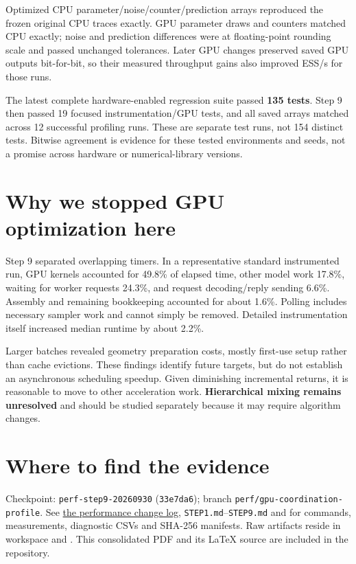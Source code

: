 \documentclass[11pt]{article}
\newcommand{\heading}[1]{\section*{#1}}
\begin{document}
Optimized CPU parameter/noise/counter/prediction arrays reproduced the frozen
original CPU traces exactly. GPU parameter draws and counters matched CPU exactly;
noise and prediction differences were at floating-point rounding scale and passed
unchanged tolerances. Later GPU changes preserved saved GPU outputs bit-for-bit,
so their measured throughput gains also improved ESS/s for those runs.

The latest complete hardware-enabled regression suite passed \textbf{135 tests}.
Step 9 then passed 19 focused instrumentation/GPU tests, and all saved arrays
matched across 12 successful profiling runs. These are separate test runs, not
154 distinct tests. Bitwise agreement is evidence for these tested environments
and seeds, not a promise across hardware or numerical-library versions.

\heading{Why we stopped GPU optimization here}
Step 9 separated overlapping timers. In a representative standard instrumented
run, GPU kernels accounted for 49.8\% of elapsed time, other model work 17.8\%,
waiting for worker requests 24.3\%, and request decoding/reply sending 6.6\%.
Assembly and remaining bookkeeping accounted for about 1.6\%.
Polling includes necessary sampler work and cannot simply be removed. Detailed
instrumentation itself increased median runtime by about 2.2\%.

Larger batches revealed geometry preparation costs, mostly first-use setup rather
than cache evictions. These findings identify future targets, but do not establish
an asynchronous scheduling speedup. Given diminishing incremental returns, it is
reasonable to move to other acceleration work. \textbf{Hierarchical mixing remains
unresolved} and should be studied separately because it may require algorithm changes.

\heading{Where to find the evidence}
\small\raggedright
Checkpoint: \texttt{perf-step9-20260930} (\texttt{33e7da6}); branch
\texttt{perf/gpu-coordination-profile}. See \href{CHANGELOG.md}{the performance change log},
\texttt{STEP1.md}--\texttt{STEP9.md} and  for commands,
measurements, diagnostic CSVs and SHA-256 manifests. Raw artifacts reside in workspace
 and .
This consolidated PDF and its LaTeX source are included in the repository.
\end{document}

